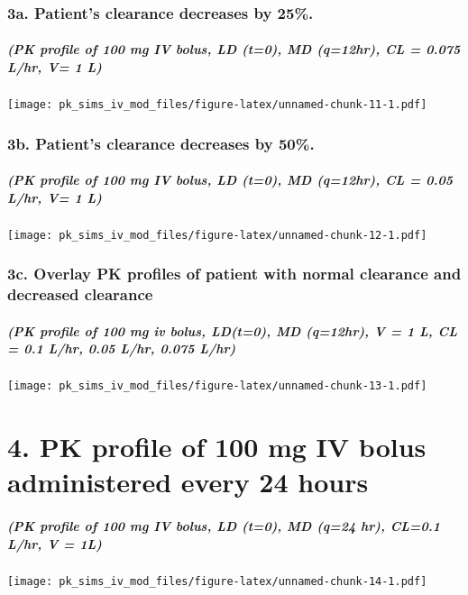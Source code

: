 \documentclass[]{article}
\begin{document}
\subsubsection{3a. Patient's clearance decreases by
25\%.}\label{a.-patients-clearance-decreases-by-25.-2}

\subparagraph{(PK profile of 100 mg IV bolus, LD (t=0), MD (q=12hr), CL
= 0.075 L/hr, V= 1
L)}\label{pk-profile-of-100-mg-iv-bolus-ld-t0-md-q12hr-cl-0.075-lhr-v-1-l}

\texttt{[image: pk\_sims\_iv\_mod\_files/figure-latex/unnamed-chunk-11-1.pdf]}

\subsubsection{3b. Patient's clearance decreases by
50\%.}\label{b.-patients-clearance-decreases-by-50.-2}

\subparagraph{(PK profile of 100 mg IV bolus, LD (t=0), MD (q=12hr), CL
= 0.05 L/hr, V= 1
L)}\label{pk-profile-of-100-mg-iv-bolus-ld-t0-md-q12hr-cl-0.05-lhr-v-1-l}

\texttt{[image: pk\_sims\_iv\_mod\_files/figure-latex/unnamed-chunk-12-1.pdf]}

\subsubsection{3c. Overlay PK profiles of patient with normal clearance
and decreased
clearance}\label{c.-overlay-pk-profiles-of-patient-with-normal-clearance-and-decreased-clearance-1}

\subparagraph{(PK profile of 100 mg iv bolus, LD(t=0), MD (q=12hr), V =
1 L, CL = 0.1 L/hr, 0.05 L/hr, 0.075
L/hr)}\label{pk-profile-of-100-mg-iv-bolus-ldt0-md-q12hr-v-1-l-cl-0.1-lhr-0.05-lhr-0.075-lhr}

\texttt{[image: pk\_sims\_iv\_mod\_files/figure-latex/unnamed-chunk-13-1.pdf]}

\section{4. PK profile of 100 mg IV bolus administered every 24
hours}\label{pk-profile-of-100-mg-iv-bolus-administered-every-24-hours}

\subparagraph{(PK profile of 100 mg IV bolus, LD (t=0), MD (q=24 hr),
CL=0.1 L/hr, V =
1L)}\label{pk-profile-of-100-mg-iv-bolus-ld-t0-md-q24-hr-cl0.1-lhr-v-1l}

\texttt{[image: pk\_sims\_iv\_mod\_files/figure-latex/unnamed-chunk-14-1.pdf]}
\end{document}
